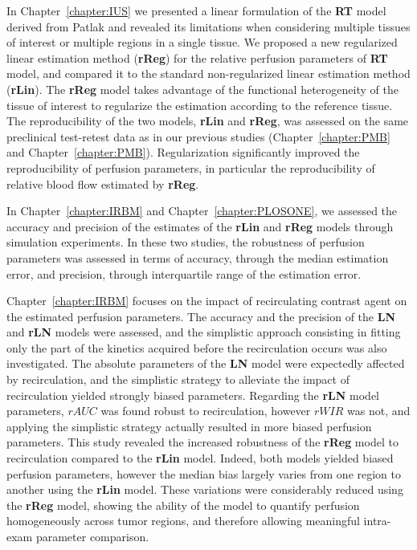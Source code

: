 In Chapter~\ref{chapter:IUS} we presented a linear formulation of the \textbf{RT} model derived from Patlak and revealed its limitations when considering multiple tissues of interest or multiple regions in a single tissue. 
We proposed a new regularized linear estimation method (\textbf{rReg}) for the relative perfusion parameters of \textbf{RT} model, and compared it to the standard non-regularized linear estimation method (\textbf{rLin}).
The \textbf{rReg} model takes advantage of the functional heterogeneity of the tissue of interest to regularize the estimation according to the reference tissue.
The reproducibility of the two models, \textbf{rLin} and \textbf{rReg}, was assessed on the same preclinical test-retest data as in our previous studies (Chapter~\ref{chapter:PMB} and Chapter~\ref{chapter:PMB}).
Regularization significantly improved the reproducibility of perfusion parameters, in particular the reproducibility of relative blood flow estimated by \textbf{rReg}.

In Chapter~\ref{chapter:IRBM} and Chapter~\ref{chapter:PLOSONE}, we assessed the accuracy and precision of the estimates of the \textbf{rLin} and \textbf{rReg} models through simulation experiments.
In these two studies, the robustness of perfusion parameters was assessed in terms of accuracy, through the median estimation error, and precision, through interquartile range of the estimation error.

Chapter~\ref{chapter:IRBM} focuses on the impact of recirculating contrast agent on the estimated perfusion parameters.
The accuracy and the precision of the \textbf{LN} and \textbf{rLN} models were assessed, and the simplistic approach consisting in fitting only the part of the kinetics acquired before the recirculation occurs was also investigated.
The absolute parameters of the \textbf{LN} model were expectedly affected by recirculation, and the simplistic strategy to alleviate the impact of recirculation yielded strongly biased parameters.
Regarding the \textbf{rLN} model parameters, $rAUC$ was found robust to recirculation, however $rWIR$ was not, and applying the simplistic strategy actually resulted in more biased perfusion parameters.
This study revealed the increased robustness of the \textbf{rReg} model to recirculation compared to the \textbf{rLin} model.
Indeed, both models yielded biased perfusion parameters, however the median bias largely varies from one region to another using the \textbf{rLin} model.
These variations were considerably reduced using the \textbf{rReg} model, showing the ability of the model to quantify perfusion homogeneously across tumor regions, and therefore allowing meaningful intra-exam parameter comparison.

